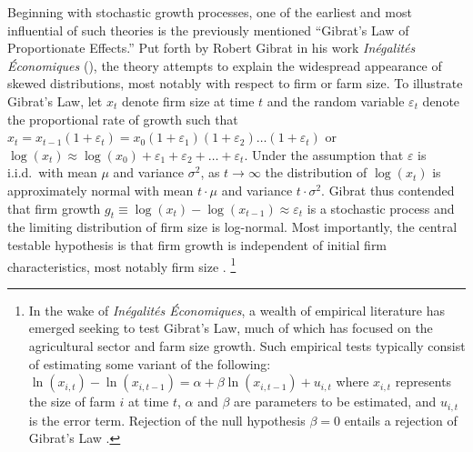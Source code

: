 \documentclass[english]{article}
\begin{document}
Beginning with stochastic growth processes, one of the earliest and most 
influential of such theories is the previously mentioned ``Gibrat's Law of 
Proportionate Effects.'' 
Put forth by Robert Gibrat in his work 
\emph{In\'{e}galit\'{e}s \'{E}conomiques} (\citeyear{gibrat1931}), 
the theory attempts to explain the widespread appearance of skewed 
distributions, most notably with respect to firm or farm size.
To illustrate Gibrat's Law, let $x_t$ denote firm size at time $t$ and the 
random variable $\varepsilon_t$ denote the proportional rate of growth such 
that $x_t = x_{t-1}(1 + \varepsilon_t) = x_{0}(1 + \varepsilon_1)(1 + 
\varepsilon_2) \ldots (1 + \varepsilon_t)$ or $\log(x_t) \approx \log(x_{0}) 
+ \varepsilon_1 + \varepsilon_2 + \ldots + \varepsilon_t$. 
Under the assumption that $\varepsilon$ is i.i.d.\ with mean $\mu$ and 
variance $\sigma^2$, as $t \to \infty$ the distribution of $\log(x_t)$ is 
approximately normal with mean $t \cdot \mu $ and variance 
$t \cdot \sigma^2$. 
Gibrat thus contended that firm growth $g_t \equiv \log(x_t) - \log(x_{t-1}) 
\approx \varepsilon_t$ is a stochastic process and the limiting distribution of 
firm size is log-normal.
Most importantly, the central testable hypothesis is that firm growth is 
independent of initial firm characteristics, most notably firm size 
\citep{sutton1997}.%
\footnote{In the wake of \emph{In\'{e}galit\'{e}s \'{E}conomiques}, 
a wealth of empirical literature has emerged seeking to test Gibrat's Law, 
much of which has focused on the agricultural sector and farm size growth. 
Such empirical tests typically consist of estimating some variant of the 
following: $\ln(x_{i,t}) - \ln(x_{i,t-1}) = \alpha + \beta \ln(x_{i,t-1}) + 
u_{i,t}$ where $x_{i,t}$ represents the size of farm $i$ at time $t$, $\alpha$ 
and $\beta$ are parameters to be estimated, and $u_{i,t}$ is the error term. 
Rejection of the null hypothesis $\beta=0$ entails a rejection of Gibrat's Law \citep{weiss1999}.} 
\end{document}
